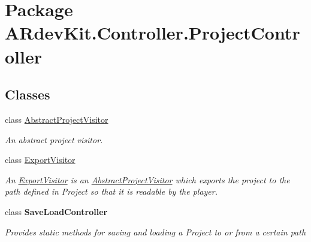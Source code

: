 \hypertarget{namespace_a_rdev_kit_1_1_controller_1_1_project_controller}{\section{Package A\-Rdev\-Kit.\-Controller.\-Project\-Controller}
\label{namespace_a_rdev_kit_1_1_controller_1_1_project_controller}
}
\subsection*{Classes}
\begin{DoxyCompactItemize}
\item 
class \hyperlink{class_a_rdev_kit_1_1_controller_1_1_project_controller_1_1_abstract_project_visitor}{Abstract\-Project\-Visitor}
\begin{DoxyCompactList}\small\item\em An abstract project visitor. \end{DoxyCompactList}\item 
class \hyperlink{class_a_rdev_kit_1_1_controller_1_1_project_controller_1_1_export_visitor}{Export\-Visitor}
\begin{DoxyCompactList}\small\item\em An \hyperlink{class_a_rdev_kit_1_1_controller_1_1_project_controller_1_1_export_visitor}{Export\-Visitor} is an \hyperlink{class_a_rdev_kit_1_1_controller_1_1_project_controller_1_1_abstract_project_visitor}{Abstract\-Project\-Visitor} which exports the project to the path defined in Project so that it is readable by the player. \end{DoxyCompactList}\item 
class {\bfseries Save\-Load\-Controller}
\begin{DoxyCompactList}\small\item\em Provides static methods for saving and loading a Project to or from a certain path \end{DoxyCompactList}\end{DoxyCompactItemize}
